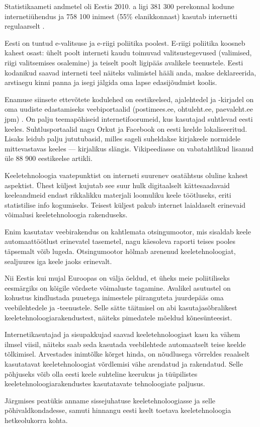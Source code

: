 \documentclass[]{../metanetpaper}
\begin{document}
\begin{multicols}{2}
Statistikaameti andmetel oli Eestis 2010. a ligi 381 300 perekonnal kodune internetiühendus ja 758 100 inimest (55\% elanikkonnast) kasutab internetti regulaarselt \cite{Stat3}.


Eesti on tuntud e-valitsuse ja e-riigi polii\-tika poolest. 
E-riigi poliitika koosneb kahest osast: ühelt poolt interneti kaudu toimuvad valitsustegevused (valimised, rii\-gi valitsemises osalemine) ja teiselt poolt ligipääs avalikele teenustele. 
Eesti kodanikud saavad interneti teel näiteks valimistel hääli anda, makse deklareerida, arstiaegu kinni panna ja isegi jälgida oma lapse edasijõudmist koolis.



Enamuse siinsete ettevõtete kodulehed on eestikeelsed, ajalehtedel ja -kirjadel on oma uudiste edastamiseks veebi\-portaalid (postimees.ee, ohtuleht.ee, paevaleht.ee jpm) \cite{Neti}. 
On palju teemapõhiseid  internetifoorumeid, kus kasutajad suhtlevad eesti keeles.
Suhtlusportaalid nagu Orkut ja Facebook on eesti keelde lokaliseeritud. 
Lisaks leidub palju jututubasid, milles sageli suheldakse kirjakeele
normidele mittevastavas keeles --- kirjalikus slängis. 
Vikipeediasse on vabatahtlikud lisanud üle 88 900 eestikeelse artikli.

Keeletehnoloogia vaatepunktist on interneti suurenev osatähtsus oluline kahest aspektist. 
Ühest küljest kujutab see suur hulk digitaalselt kättesaadavaid keeleandmeid endast rikkalikku materjali loomuliku keele töötluseks, eriti statistilise info kogumiseks. 
Teisest küljest pakub internet laialdaselt erinevaid võimalusi keeletehnoloogia rakenduseks.

Enim kasutatav veebirakendus on kahtle\-mata otsingumootor, mis sisaldab keele automaattöötlust erinevatel tasemetel, nagu käesoleva raporti teises pooles täpsemalt võib lugeda. 
Otsingumootor hõlmab arenenud keeletehnoloogiat, sealjuures iga keele jaoks erinevalt.

Nii Eestis kui mujal Euroopas on välja öeldud, et üheks meie poliitiliseks eesmärgiks on kõigile võrdsete võimaluste tagamine.
Avalikel asutustel on kohustus kindlustada puuetega inimestele piiranguteta juurdepääs oma veebilehtedele ja -teenustele. 
Selle sätte täitmisel on abi kasutajasõbralikest keeletehnoloogiarakendustest, näi\-teks pimedatele mõeldud kõnesünteesist.

Internetikasutajad ja sisupakkujad saavad keeletehnoloogiast kasu ka vähem ilmsel viisil, näiteks saab seda kasutada veebi\-lehtede automaatselt teise keelde tõlkimisel. 
Arvestades inimtõlke kõrget hinda, on nõudlusega võrreldes reaalselt kasutatavat keeletehnoloogiat võrdlemisi vähe arendatud ja rakendatud. 
Selle põhjuseks võib olla eesti keele suhteline keerukus ja tüüpilistes keeletehnoloogiarakendustes kasutatavate tehnoloogiate paljusus.

Järgmises peatükis anname sissejuhatuse keeletehnoloogiasse ja selle põhivaldkondadesse, samuti hinnangu eesti keelt toetava keeletehnoloogia hetkeolukorra kohta.

\end{multicols}
\end{document}
